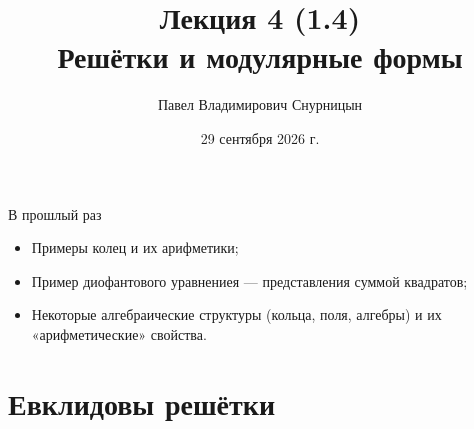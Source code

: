 \documentclass[serif, aspectratio=169]{beamer}
\author{Павел Владимирович Снурницын}
\title{Лекция 4 (1.4)\\ Решётки и модулярные формы}
\institute{к.ф.-м.н., с.н.с., ИБ ВМК}
\date{\small 29 сентября 2026 г.}
\begin{document}
\begin{frame}
    \titlepage
\end{frame}
\note{}

\begin{frame}{В прошлый раз}
    \begin{itemize}
        \item Примеры колец и их арифметики;
        \item Пример диофантового уравнениея --- представления суммой квадратов;
        \item Некоторые алгебраические структуры (кольца, поля, алгебры) и их «арифметические» свойства.
    \end{itemize}
\end{frame}
\note{%
\begin{itemize}
    \item ---
\end{itemize}
}

\section{Евклидовы решётки}
\end{document}
